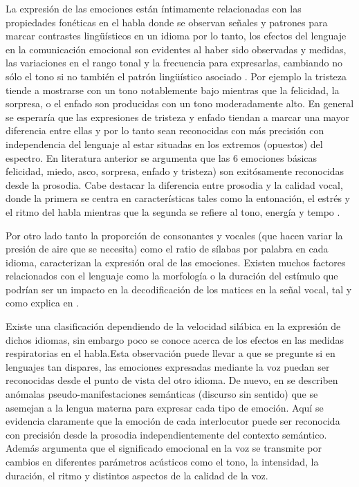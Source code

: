 \documentclass[11pt,a4paper,spanish]{book}
\begin{document}
	La expresión de las emociones están íntimamente relacionadas con las propiedades fonéticas en el habla donde se observan señales y patrones para marcar contrastes lingüísticos en un idioma \cite{Pell2001} por lo tanto, los efectos del lenguaje en la comunicación emocional son evidentes al haber sido observadas y medidas, las variaciones en el rango tonal y la frecuencia para expresarlas, cambiando no sólo el tono si no también el patrón lingüístico asociado \cite{Davletcharova2015}. Por ejemplo la tristeza tiende a mostrarse con un tono notablemente bajo mientras que la felicidad, la sorpresa, o el enfado son producidas con un tono moderadamente alto. En general se esperaría que las expresiones de tristeza y enfado tiendan a marcar una mayor diferencia entre ellas y por lo tanto sean reconocidas con más precisión con independencia del lenguaje al estar situadas en los extremos (opuestos) del espectro.
	En literatura anterior \cite{Pell2011} se argumenta que las 6 emociones básicas felicidad, miedo, asco, sorpresa, enfado y tristeza) son exitósamente reconocidas desde la prosodia. Cabe destacar la diferencia entre prosodia y la calidad vocal, donde la primera se centra en características tales como la entonación, el estrés y el ritmo del habla mientras que la segunda se refiere al tono, energía y tempo \cite{Processing2015} . 
	
	Por otro lado tanto la proporción de consonantes y vocales (que hacen variar la presión de aire que se necesita) como el ratio de sílabas por palabra en cada idioma, caracterizan la expresión oral de las emociones. Existen muchos factores relacionados con el lenguaje como la morfología o la duración del estímulo que podrían ser un impacto en la decodificación de los matices en la señal vocal, tal y como explica en \cite{Chen2017}.
	
	Existe una clasificación dependiendo de la velocidad silábica en la expresión de dichos idiomas, sin embargo poco se conoce acerca de los efectos en las medidas respiratorias en el habla.Esta observación puede llevar a que se pregunte si en lenguajes tan dispares, las emociones expresadas mediante la voz puedan ser reconocidas desde el punto de vista del otro idioma.
	De nuevo, en \cite{Pell2009} se describen anómalas pseudo-manifestaciones semánticas (discurso sin sentido) que se asemejan a la lengua materna para expresar cada tipo de emoción. Aquí se evidencia claramente que la emoción de cada interlocutor puede ser reconocida con precisión desde la prosodia independientemente del contexto semántico. Además argumenta que el significado emocional en la voz se transmite por cambios en diferentes parámetros acústicos como el tono, la intensidad, la duración, el ritmo y distintos aspectos de la calidad de la voz.
	
\end{document}
